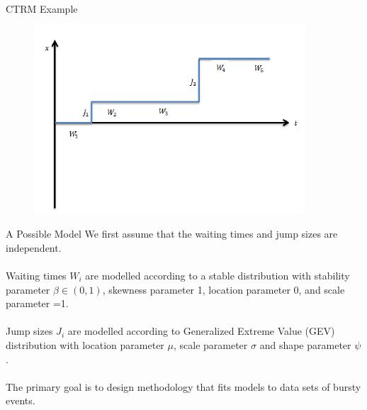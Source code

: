 \documentclass{beamer}
\begin{document}
\begin{frame}{CTRM Example}
    \begin{figure}
        \centering
        \includegraphics[scale=1]{CTRM.png}
    \end{figure}
\end{frame}

\begin{frame}{ A Possible Model }
	We first assume that the waiting times and jump sizes are independent.
	\\~\\
	Waiting times $W_i$ are modelled according to a stable distribution with stability parameter $\beta \in (0,1)$, skewness parameter 1, location parameter 0, and scale parameter =1.
	\\~\\
	Jump sizes $J_i$ are modelled according to Generalized Extreme Value (GEV) distribution with location parameter $\mu$, scale parameter $\sigma$ and shape parameter $\psi$.
	\\~\\
	The primary goal is to design methodology that fits models to data sets of bursty events.
\end{frame}
\end{document}
